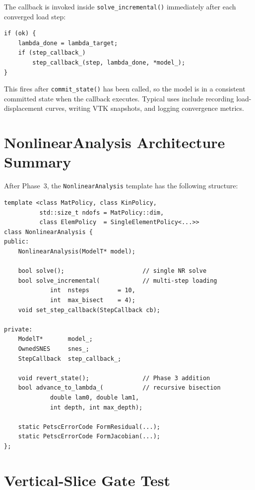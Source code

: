 The callback is invoked inside \texttt{solve\_incremental()} immediately
after each converged load step:

\begin{verbatim}
if (ok) {
    lambda_done = lambda_target;
    if (step_callback_)
        step_callback_(step, lambda_done, *model_);
}
\end{verbatim}

\noindent
This fires after \texttt{commit\_state()} has been called, so the model
is in a consistent committed state when the callback executes.
Typical uses include recording load-displacement curves, writing VTK
snapshots, and logging convergence metrics.


\section{NonlinearAnalysis Architecture Summary}
\label{sec:phase3-architecture}

After Phase~3, the \texttt{NonlinearAnalysis} template has the
following structure:

\begin{verbatim}
template <class MatPolicy, class KinPolicy,
          std::size_t ndofs = MatPolicy::dim,
          class ElemPolicy  = SingleElementPolicy<...>>
class NonlinearAnalysis {
public:
    NonlinearAnalysis(ModelT* model);

    bool solve();                      // single NR solve
    bool solve_incremental(            // multi-step loading
             int  nsteps        = 10,
             int  max_bisect    = 4);
    void set_step_callback(StepCallback cb);

private:
    ModelT*       model_;
    OwnedSNES     snes_;
    StepCallback  step_callback_;

    void revert_state();               // Phase 3 addition
    bool advance_to_lambda_(           // recursive bisection
             double lam0, double lam1,
             int depth, int max_depth);

    static PetscErrorCode FormResidual(...);
    static PetscErrorCode FormJacobian(...);
};
\end{verbatim}


\section{Vertical-Slice Gate Test}
\label{sec:phase3-vertical-slice-test}

